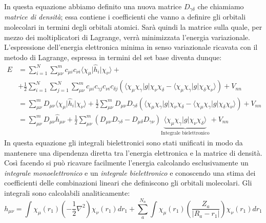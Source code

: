 \documentclass[oneside]{amsbook}
\numberwithin{section}{chapter}
\numberwithin{equation}{section}
\numberwithin{figure}{section}
\begin{document}
In questa equazione abbiamo definito una nuova matrice $D_{\gamma\delta }$ che chiamiamo \emph{matrice di densità}; essa contiene i coefficienti che vanno a definire gli orbitali molecolari in termini degli orbitali atomici. Sarà quindi la matrice sulla quale, per mezzo dei moltiplicatori di Lagrange, verrà minimizzata l'energia variazionale.
L'espressione dell'energia elettronica minima in senso variazionale ricavata con il metodo di Lagrange, espressa  in termini del set base diventa dunque:
\begin{equation}
\begin{aligned}
E&=\sum \limits_{i=1} ^{N}\sum \limits _{\mu \nu} ^{m}c_{\mu i} c_{\nu i} \langle\chi_{\mu}\vert \hat{h}_{i}\vert\chi_{\nu}\rangle + \\
&+ \frac{1}{2} \sum \limits_{i=1} ^{N} \sum \limits_{j=1} ^{N} \sum \limits _{\mu \nu} ^{m} c_{\mu i} c_{\gamma j}c_{\nu i} c_{\delta j}(\langle\chi_{\mu}\chi_{\gamma}\vert g \vert\chi_{\nu}\chi_{\delta}-\langle\chi_{\mu}\chi_{\gamma}\vert g \vert\chi_{\delta}\chi_{\nu}\rangle) +V_{nn}\\
&=\sum \limits _{\mu \nu} ^{m}D_{\mu \nu} \langle\chi_{\mu}\vert \hat{h}_{i}\vert\chi_{\nu}\rangle + \frac{1}{2}  \sum \limits _{\mu \nu} ^{m} D_{\mu \nu} D_{\gamma \delta}(\langle\chi_{\mu}\chi_{\gamma}\vert g \vert\chi_{\nu}\chi_{\delta}-\langle\chi_{\mu}\chi_{\gamma}\vert g \vert\chi_{\delta}\chi_{\nu}\rangle) +V_{nn} \\
&= \sum \limits _{\mu \nu} ^{m}D_{\mu \nu}\hat{h}_{\mu \nu} + \frac{1}{2}  \sum \limits _{\mu \nu} ^{m}( D_{\mu \nu} D_{\gamma \delta}- D_{\mu \delta} D_{\gamma \nu})\underbrace{\langle\chi_{\mu}\chi_{\gamma}\vert g \vert\chi_{\nu}\chi_{\delta}\rangle}_{\text{Integrale bielettronico}} +V_{nn}
\end{aligned}
\end{equation}
In questa equazione gli integrali bielettronici sono stati unificati in modo da mantenere una dipendenza diretta tra l'energia elettronica e la matrice di densità. Così facendo si può ricavare facilmente l'energia calcolando esclusivamente un \emph{integrale monoelettronico} e un \emph{integrale bielettronico} e conoscendo una stima dei coefficienti delle combinazioni lineari che definiscono gli orbitali molecolari.
Gli integrali sono calcolabili analiticamente:
\begin{equation}
h_{\mu \nu}= \int \chi_\mu (r_1)\left(-\frac{1}{2}\nabla^2\right) \chi_\nu(r_1) dr_1 + \sum \limits_a ^{N_n} \int \chi_\mu (r_1)\left(\frac{Z_a}{\vert R_a-r_1\vert}\right)\chi_\nu(r_1) dr_1
\end{equation}
\end{document}
